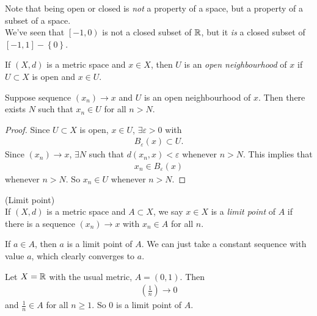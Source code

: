 \documentclass[a4paper]{article}
\begin{document}
\begin{rem}
Note that being open or closed is \emph{not} a property of a space, but a property of a subset of a space.\\
We've seen that $\left[-1,0\right)$ is not a closed subset of $\mathbb{R}$, but it \emph{is} a closed subset of $\left[-1,1\right] - \left\{0\right\}$.
\end{rem}

\begin{defi}
If $\left(X,d\right)$ is a metric space and $x\in X$, then $U$ is an \emph{open neighbourhood} of $x$ if $U\subset X$ is open and $x\in U$.
\end{defi}

\begin{prop}
Suppose sequence $\left(x_n\right) \to x$ and $U$ is an open neighbourhood of $x$. Then there exists $N$ such that $x_n\in U$ for all $n>N$.
\begin{proof}
Since $U\subset X$ is open, $x\in U$, $\exists \varepsilon > 0$ with
\begin{equation*}
\begin{aligned}
B_\varepsilon \left(x\right) \subset U.
\end{aligned}
\end{equation*}
Since $\left(x_n\right) \to x$, $\exists N$ such that $d\left(x_n,x\right) < \varepsilon$ whenever $n>N$. This implies that
\begin{equation*}
\begin{aligned}
x_n \in B_\varepsilon \left(x\right)
\end{aligned}
\end{equation*}
whenever $n>N$. So $x_n\in U$ whenever $n>N$.
\end{proof}
\end{prop}

\begin{defi} (Limit point)\\
If $\left(X,d\right)$ is a metric space and $A \subset X$, we say $x\in X$ is a \emph{limit point} of $A$ if there is a sequence $\left(x_n\right) \to x$ with $x_n \in A$ for all $n$.
\end{defi}

\begin{eg}
If $a\in A$, then $a$ is a limit point of $A$. We can just take a constant sequence with value $a$, which clearly converges to $a$.
\end{eg}

\begin{eg}
Let $X = \mathbb{R}$ with the usual metric, $A=\left(0,1\right)$. Then
\begin{equation*}
\begin{aligned}
\left(\frac{1}{n}\right) \to 0
\end{aligned}
\end{equation*}
and $\frac{1}{n} \in A$ for all $n\geq 1$. So $0$ is a limit point of $A$.
\end{eg}
\end{document}

